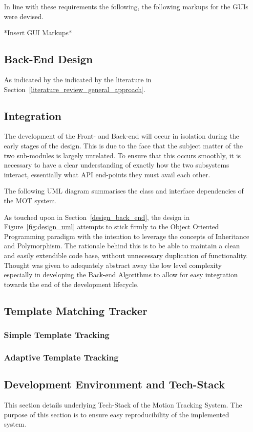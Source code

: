 In line with these requirements the following, the following markups for the
GUIs were devised.

*Insert GUI Markups* 

\subsection{Back-End Design}
As indicated by the indicated by the literature in
Section~\ref{literature_review_general_approach}. 

\subsection{Integration}
The development of the Front- and Back-end will occur in isolation during the
early stages of the design. This is due to the face that the subject matter of
the two sub-modules is largely unrelated.  To ensure that this occurs smoothly,
it is necessary to have a clear understanding of exactly how the two subsystems
interact, essentially what API end-points they must avail each other.

The following UML diagram summarises the class and interface dependencies of the
MOT system.

\newpage
{} 
\newpage
As touched upon in Section~\ref{design_back_end}, the design in
Figure~\ref{fig:design_uml} attempts to stick firmly to the Object Oriented
Programming paradigm with the intention to leverage the concepts of Inheritance and
Polymorphism. The rationale behind this is to be able to maintain a clean and
easily extendible code base, without unnecessary duplication of functionality.
Thought was given to adequately abstract away the low level complexity
especially in developing the Back-end Algorithms to allow for easy integration
towards the end of the development lifecycle. 


\subsection{Template Matching Tracker}

\subsubsection{Simple Template Tracking}

\subsubsection{Adaptive Template Tracking}

\subsection{Development Environment and Tech-Stack}
This section details underlying Tech-Stack of the Motion Tracking System. The
purpose of this section is to ensure easy reproducibility of the implemented
system.


